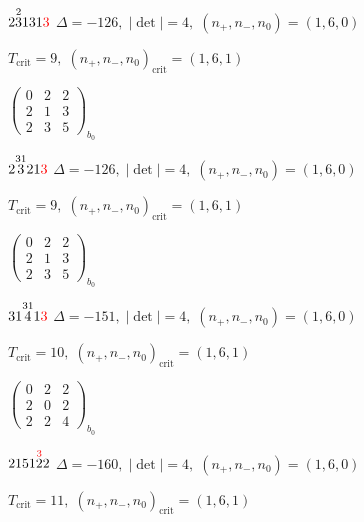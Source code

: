 \documentclass[10pt]{article}
\begin{document}
\smallskip

$2\overset{2}{3}131\textcolor{red}{3}$ \quad $\Delta=-126,\; |\det|=4,\; (n_+,n_-,n_0)=(1,6,0)$

\hspace{1em}$T_{\text{crit}}=9,\; (n_+,n_-,n_0)_{\text{crit}}=(1,6,1)$

\hspace{2em}$\left(\begin{smallmatrix}0 & 2 & 2 \\ 2 & 1 & 3 \\ 2 & 3 & 5\end{smallmatrix}\right)_{\!b_0}$

\smallskip

$2\overset{31}{3}21\textcolor{red}{3}$ \quad $\Delta=-126,\; |\det|=4,\; (n_+,n_-,n_0)=(1,6,0)$

\hspace{1em}$T_{\text{crit}}=9,\; (n_+,n_-,n_0)_{\text{crit}}=(1,6,1)$

\hspace{2em}$\left(\begin{smallmatrix}0 & 2 & 2 \\ 2 & 1 & 3 \\ 2 & 3 & 5\end{smallmatrix}\right)_{\!b_0}$

\smallskip

$31\overset{31}{4}1\textcolor{red}{3}$ \quad $\Delta=-151,\; |\det|=4,\; (n_+,n_-,n_0)=(1,6,0)$

\hspace{1em}$T_{\text{crit}}=10,\; (n_+,n_-,n_0)_{\text{crit}}=(1,6,1)$

\hspace{2em}$\left(\begin{smallmatrix}0 & 2 & 2 \\ 2 & 0 & 2 \\ 2 & 2 & 4\end{smallmatrix}\right)_{\!b_0}$

\smallskip

$2151\overset{\textcolor{red}{3}}{2}2$ \quad $\Delta=-160,\; |\det|=4,\; (n_+,n_-,n_0)=(1,6,0)$

\hspace{1em}$T_{\text{crit}}=11,\; (n_+,n_-,n_0)_{\text{crit}}=(1,6,1)$
\end{document}
